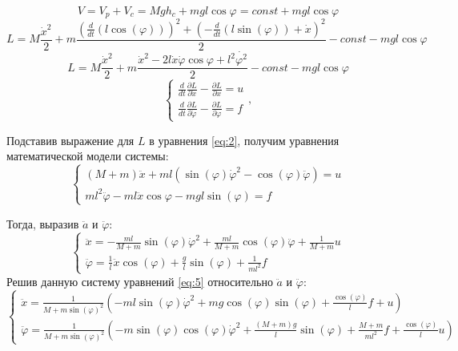 \[V = V_p + V_c = Mgh_c + mgl \cos{\varphi} =  const +  mgl \cos{\varphi}\]
\[
  L = M\frac{\dot{x}^2}{2} + m\frac{(\frac{d}{dt}(l\cos(\varphi)))^2 + (-\frac{d}{dt}(l\sin(\varphi)) + \dot{x})^2}{2} - const -  mgl \cos{\varphi}
\]
\[
  L = M\frac{\dot{x}^2}{2} + m\frac{\dot x^2 - 2l \dot x \dot \varphi \cos \varphi + l^2 \dot{\varphi^2}}{2} - const -  mgl \cos{\varphi}
\]
\begin{equation} \label{eq:2}
  \begin{cases}
      \frac{d}{dt}\frac{\partial L}{\partial \dot{x}} - \frac{\partial L}{\partial x} = u \\
      \frac{d}{dt}\frac{\partial L}{\partial \dot{\varphi}} - \frac{\partial L}{\partial \varphi} = f 
  \end{cases},
\end{equation}

Подставив выражение для $L$ в уравнения \ref{eq:2}, получим уравнения математической модели системы:
\begin{equation} \label{eq:4}
  \begin{cases}
      (M+m)\ddot{x} + ml(\sin(\varphi)\dot{\varphi}^2 - \cos(\varphi)\ddot{\varphi}) = u \\
      ml^2\ddot{\varphi} - ml\ddot{x}\cos{\varphi} - mgl\sin(\varphi)= f
  \end{cases}
\end{equation}

Тогда, выразив $\ddot{a}$ и $\ddot{\varphi}$:
\begin{equation} \label{eq:5}
  \begin{cases}
      \ddot x = -\frac{ml}{M+m}\sin(\varphi)\dot{\varphi}^2 + \frac{ml}{M+m}\cos(\varphi)\ddot{\varphi} + \frac{1}{M+m}u \\
      \ddot \varphi = \frac{1}{l}\ddot x \cos(\varphi) + \frac{g}{l}\sin(\varphi) + \frac{1}{ml^2}f
  \end{cases}
\end{equation}
Решив данную систему уравнений \ref{eq:5} относительно $\ddot a$ и $\ddot \varphi$:
\begin{equation} \label{eq:6}
  \begin{cases}
      \ddot x = \frac{1}{M + m\sin(\varphi)^2}( -ml\sin(\varphi)\dot{\varphi}^2 + mg\cos(\varphi)\sin(\varphi) + \frac{\cos(\varphi)}{l}f + u ) \\
      \ddot \varphi = \frac{1}{M + m\sin(\varphi)^2}( -m\sin(\varphi)\cos(\varphi)\dot{\varphi}^2 + \frac{(M+m)g}{l}\sin(\varphi) + \frac{M+m}{ml^2}f + \frac{\cos(\varphi)}{l}u )
  \end{cases}
\end{equation}

